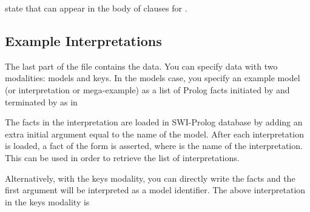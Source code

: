 \documentclass[letterpaper,10pt,english]{sphinxmanual}
\begin{document}
state that  can appear in the body of clauses for .


\subsection{Example Interpretations}
\label{\detokenize{index:example-interpretations}}
The last part of the file contains the data.
You can specify data with two modalities: models and keys.
In the models case, you specify an example model (or interpretation or mega-example) as a list of Prolog facts initiated by  and terminated by  as in

\begin{sphinxVerbatim}[commandchars=\\\{\}]
\end{sphinxVerbatim}

The facts in the interpretation are loaded in SWI-Prolog database by adding an extra initial argument equal to the name of the model.
After each interpretation is loaded, a fact of the form  is asserted, where  is the name of the interpretation.
This can be used in order to retrieve the list of interpretations.

Alternatively, with the keys modality, you can directly write the facts and the first argument will be interpreted as a model identifier.
The above interpretation in the keys modality is
\end{document}

